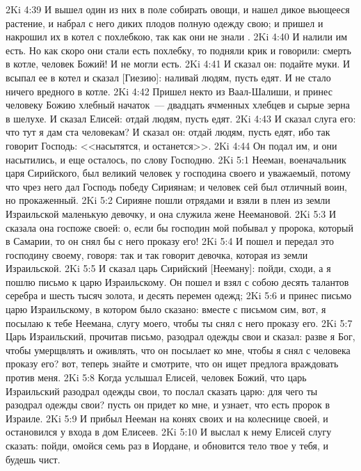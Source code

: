 \vs 2Ki 4:39 И вышел один из них в поле собирать овощи, и нашел дикое вьющееся растение, и набрал с него диких плодов полную одежду свою; и пришел и накрошил их в котел с похлебкою, так как они не знали .
\vs 2Ki 4:40 И налили им есть. Но как скоро они стали есть похлебку, то подняли крик и говорили: смерть в котле, человек Божий! И не могли есть.
\vs 2Ki 4:41 И сказал он: подайте муки. И всыпал ее в котел и сказал [Гиезию]: наливай людям, пусть едят. И не стало ничего вредного в котле.
\vs 2Ki 4:42 Пришел некто из Ваал-Шалиши, и принес человеку Божию хлебный начаток~--- двадцать ячменных хлебцев и сырые зерна в шелухе. И сказал Елисей: отдай людям, пусть едят.
\vs 2Ki 4:43 И сказал слуга его: что тут я дам ста человекам? И сказал он: отдай людям, пусть едят, ибо так говорит Господь: <<насытятся, и останется>>.
\vs 2Ki 4:44 Он подал им, и они насытились, и еще осталось, по слову Господню.
\vs 2Ki 5:1 Нееман, военачальник царя Сирийского, был великий человек у господина своего и уважаемый, потому что чрез него дал Господь победу Сириянам; и человек сей был отличный воин, но прокаженный.
\vs 2Ki 5:2 Сирияне  пошли отрядами и взяли в плен из земли Израильской маленькую девочку, и она служила жене Неемановой.
\vs 2Ki 5:3 И сказала она госпоже своей: о, если бы господин мой побывал у пророка, который в Самарии, то он снял бы с него проказу его!
\vs 2Ki 5:4 И пошел  и передал это господину своему, говоря: так и так говорит девочка, которая из земли Израильской.
\vs 2Ki 5:5 И сказал царь Сирийский [Нееману]: пойди, сходи, а я пошлю письмо к царю Израильскому. Он пошел и взял с собою десять талантов серебра и шесть тысяч  золота, и десять перемен одежд;
\vs 2Ki 5:6 и принес письмо царю Израильскому, в котором было сказано: вместе с письмом сим, вот, я посылаю к тебе Неемана, слугу моего, чтобы ты снял с него проказу его.
\vs 2Ki 5:7 Царь Израильский, прочитав письмо, разодрал одежды свои и сказал: разве я Бог, чтобы умерщвлять и оживлять, что он посылает ко мне, чтобы я снял с человека проказу его? вот, теперь знайте и смотрите, что он ищет предлога враждовать против меня.
\rsbpar\vs 2Ki 5:8 Когда услышал Елисей, человек Божий, что царь Израильский разодрал одежды свои, то послал сказать царю: для чего ты разодрал одежды свои? пусть он придет ко мне, и узнает, что есть пророк в Израиле.
\vs 2Ki 5:9 И прибыл Нееман на конях своих и на колеснице своей, и остановился у входа в дом Елисеев.
\vs 2Ki 5:10 И выслал к нему Елисей слугу сказать: пойди, омойся семь раз в Иордане, и обновится тело твое у тебя, и будешь чист.
